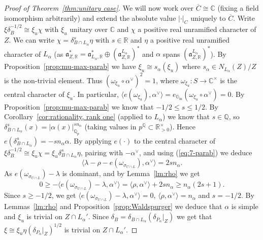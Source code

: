 \documentclass[a4paper]{amsart}
\numberwithin{equation}{section}
\theoremstyle{remark}
\theoremstyle{definition}
\newcommand{\C}{\mathbb{C}}
\newcommand{\Q}{\mathbb{Q}}
\newcommand{\R}{\mathbb{R}}
\begin{document}
\begin{proof}[Proof of Theorem~\ref{thm:unitary case}]
  We will now work over $\overline{C} \cong \C$ (fixing a field isomorphism arbitrarily) and extend the absolute value $\lvert\cdot\rvert_C$ uniquely to $\overline{C}$. 
  Write $\xi \delta_B^{-1/2} \cong \xi_u \chi$ with $\xi_u$ unitary over $\C$ and $\chi$ a positive real unramified character of $Z$.
  We can write $\chi = \delta_{B \cap L_{\alpha}}^s \eta$ with $s \in \R$ and $\eta$ a positive real unramified character of $L_{\alpha}$ 
  (as $\mathfrak{a}_{Z,\R}^* = \mathfrak{a}_{L_{\alpha},\R}^* \oplus (\mathfrak{a}_{Z,\R}^{L_{\alpha}})^*$ and $\alpha$ spans $(\mathfrak{a}_{Z,\R}^{L_{\alpha}})^*$).
  By Proposition~\ref{prop:mu-max-parab} we have $\xi_u \cong s_\alpha(\xi_u)$ where $s_{\alpha}\in N_{L_\alpha}(Z)/Z$ is the non-trivial element.
  Thus $(\omega_{\xi_u} \circ \alpha^{\vee})^2 = 1$, where $\omega_{\xi_u} \colon S \to \C^{\times}$ is the central character of $\xi_u$.
  In particular, $\langle e(\omega_{\xi_u}),\alpha^{\vee}\rangle = e_{\mathbb{G}_{\mathrm{m}}}(\omega_{\xi_u}\circ\alpha^{\vee}) = 0$.
  By Proposition~\ref{prop:mu-max-parab} we know that $-1/2 \le s \le 1/2$.   By Corollary~\ref{cor:rationality, rank one} (applied to $L_\alpha$) we know that $s \in \Q$, so $\delta_{B \cap L_{\alpha}}^{s}(x) = \lvert \alpha(x)\rvert^{sn_{\alpha}}_{\Q_p}$ (taking values in $p^{\Q} \subset \R_{>0}^\times$).
  Hence $e(\delta_{B\cap L_{\alpha}}^{s}) = -sn_{\alpha}\alpha$.
  By applying $e(\cdot)$ to the central character of $\xi \delta_B^{-1/2} \cong \xi_u \chi = \xi_u \delta_{B \cap L_{\alpha}}^s \eta$, pairing with $-\alpha^\vee$, 
  and using (\ref{eq:7-parab}) we deduce
  \begin{equation*}
    \langle \lambda - \rho - e(\omega_{\sigma_{U \cap L}}),\alpha^{\vee}\rangle = 2sn_{\alpha}.
  \end{equation*}
  As $e(\omega_{\sigma_{U\cap L}}) - \lambda$ is dominant, and by Lemma~\ref{lm:rho} we get
  \begin{equation*}
    0\ge -\langle e(\omega_{\sigma_{U\cap L}}) - \lambda,\alpha^{\vee}\rangle = \langle \rho,\alpha^{\vee}\rangle + 2sn_{\alpha}\ge n_{\alpha}(2s + 1).
  \end{equation*}
  Since $s\ge -1/2$, we get $\langle e(\omega_{\sigma_{U\cap L}}) - \lambda,\alpha^{\vee}\rangle = 0$, $\langle\rho,\alpha^{\vee}\rangle = n_{\alpha}$ and $s = -1/2$.
  By Lemmas~\ref{lm:rho} and Proposition~\ref{prop:Waldspurger} we deduce that $\alpha$ is simple and $\xi_u$ is trivial on $Z \cap L_{\alpha}'$.
  Since $\delta_B = \delta_{B \cap L_{\alpha}} (\delta_{P_\alpha}|_Z)$ we get that $\xi \cong \xi_u \eta (\delta_{P_\alpha}|_Z)^{1/2}$ is trivial on $Z \cap L_{\alpha}'$.


\end{proof}
\end{document}
